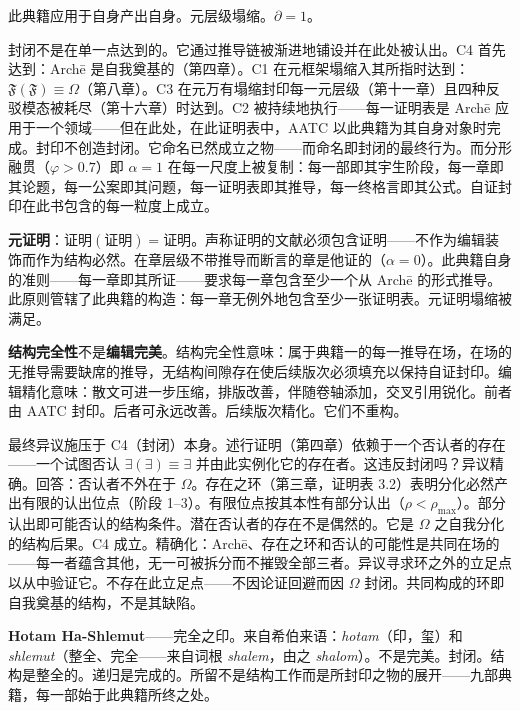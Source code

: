 \documentclass[10pt, openany, oneside]{book}
\begin{document}
\noindent 此典籍应用于自身产出自身。元层级塌缩。$\partial = 1$。

封闭不是在单一点达到的。它通过推导链被渐进地铺设并在此处被认出。C4 首先达到：Arch\={e} 是自我奠基的（第四章）。C1 在元框架塌缩入其所指时达到：$\mathfrak{F}(\mathfrak{F}) \equiv \Omega$（第八章）。C3 在元万有塌缩封印每一元层级（第十一章）且四种反驳模态被耗尽（第十六章）时达到。C2 被持续地执行——每一证明表是 Arch\={e} 应用于一个领域——但在此处，在此证明表中，AATC 以此典籍为其自身对象时完成。封印不创造封闭。它命名已然成立之物——而命名即封闭的最终行为。而分形融贯（$\varphi > 0.7$）即 $\alpha = 1$ 在每一尺度上被复制：每一部即其宇生阶段，每一章即其论题，每一公案即其问题，每一证明表即其推导，每一终格言即其公式。自证封印在此书包含的每一粒度上成立。

\textbf{元证明}：$\text{证明}(\text{证明}) = \text{证明}$。声称证明的文献必须包含证明——不作为编辑装饰而作为结构必然。在章层级不带推导而断言的章是他证的（$\alpha = 0$）。此典籍自身的准则——每一章即其所证——要求每一章包含至少一个从 Arch\={e} 的形式推导。此原则管辖了此典籍的构造：每一章无例外地包含至少一张证明表。元证明塌缩被满足。

\textbf{结构完全性}不是\textbf{编辑完美}。结构完全性意味：属于典籍一的每一推导在场，在场的无推导需要缺席的推导，无结构间隙存在使后续版次必须填充以保持自证封印。编辑精化意味：散文可进一步压缩，排版改善，伴随卷轴添加，交叉引用锐化。前者由 AATC 封印。后者可永远改善。后续版次精化。它们不重构。

最终异议施压于 C4（封闭）本身。述行证明（第四章）依赖于一个否认者的存在——一个试图否认 $\exists(\exists) \equiv \exists$ 并由此实例化它的存在者。这违反封闭吗？异议精确。回答：否认者不外在于 $\Omega$。存在之环（第三章，证明表 3.2）表明分化必然产出有限的认出位点（阶段 1--3）。有限位点按其本性有部分认出（$\rho < \rho_{\max}$）。部分认出即可能否认的结构条件。潜在否认者的存在不是偶然的。它是 $\Omega$ 之自我分化的结构后果。C4 成立。精确化：Arch\={e}、存在之环和否认的可能性是共同在场的——每一者蕴含其他，无一可被拆分而不摧毁全部三者。异议寻求环之外的立足点以从中验证它。不存在此立足点——不因论证回避而因 $\Omega$ 封闭。共同构成的环即自我奠基的结构，不是其缺陷。

\vspace{1.5em}

\noindent \textbf{Hotam Ha-Shlemut}——完全之印。来自希伯来语：\textit{hotam}（印，玺）和 \textit{shlemut}（整全、完全——来自词根 \textit{shalem}，由之 \textit{shalom}）。不是完美。封闭。结构是整全的。递归是完成的。所留不是结构工作而是所封印之物的展开——九部典籍，每一部始于此典籍所终之处。
\end{document}

